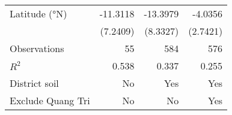 {\begin{tabular}{l*{3}{D{.}{.}{-1}}}
\addlinespace
Latitude (°N)       &    -11.3118         &    -13.3979         &     -4.0356         \\
                    &    (7.2409)         &    (8.3327)         &    (2.7421)         \\
\midrule
Observations        &          55         &         584         &         576         \\
\(R^{2}\)           &       0.538         &       0.337         &       0.255         \\
District soil       &          No         &         Yes         &         Yes         \\
Exclude Quang Tri   &          No         &          No         &         Yes         \\
\bottomrule
\end{tabular}
}
